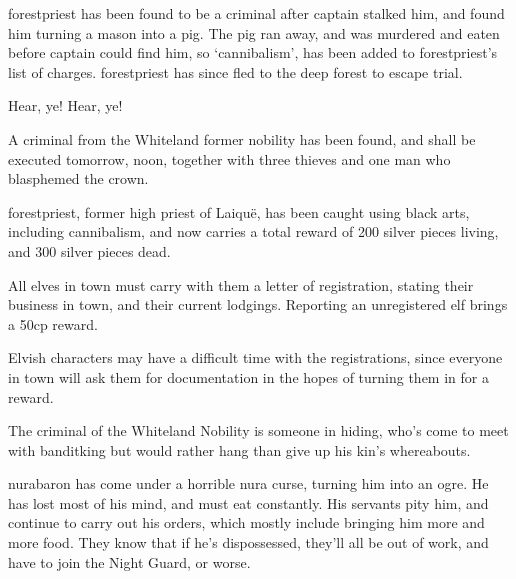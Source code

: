 \begin{multicols}{2}


\Gls{forestpriest} has been found to be a criminal after \gls{captain} stalked him, and found him turning a mason into a pig.
The pig ran away, and was murdered and eaten before \gls{captain} could find him, so `cannibalism', has been added to \gls{forestpriest}'s list of charges.
\Gls{forestpriest} has since fled to the deep forest to escape trial.

\begin{speechtext}

	Hear, ye! Hear, ye!

	A criminal from the Whiteland former nobility has been found, and shall be executed tomorrow, noon, together with three thieves and one man who blasphemed the crown.

	\Gls{forestpriest}, former high priest of Laiqu\"{e}, has been caught using black arts, including cannibalism, and now carries a total reward of 200 silver pieces living, and 300 silver pieces dead.

	All elves in town must carry with them a letter of registration, stating their business in town, and their current lodgings.  Reporting an unregistered elf brings a 50cp reward.

\end{speechtext}

Elvish characters may have a difficult time with the registrations, since everyone in town will ask them for documentation in the hopes of turning them in for a reward.

The criminal of the Whiteland Nobility is someone in hiding, who's come to meet with \gls{banditking} but would rather hang than give up his kin's whereabouts.

\resumecontents[Town]

\stopcontents[sq]

\label{desperatemeasures}

\stopcontents[Town]

\gls{nurabaron} has come under a horrible nura curse, turning him into an ogre.
He has lost most of his mind, and must eat constantly.
His servants pity him, and continue to carry out his orders, which mostly include bringing him more and more food.  They know that if he's dispossessed, they'll all be out of work, and have to join the Night Guard, or worse.


\end{multicols}
